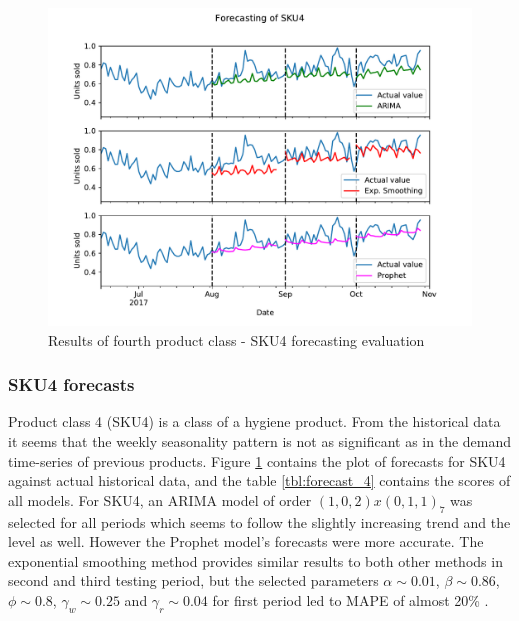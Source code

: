 \documentclass[11pt,a4paper]{article}
\begin{document}
\newpage
\begin{figure}
  \includegraphics[width=1\linewidth]{figures/SKU4_sep.pdf}
  \caption{Results of fourth product class - SKU4 forecasting evaluation}
  \label{fig:sku4_sep}
\end{figure}

\subsubsection{SKU4 forecasts}
Product class 4 (SKU4) is a class of a hygiene product. From the historical data it seems that the weekly seasonality  pattern is not as significant as in the demand time-series of previous products.
Figure \ref{fig:sku4_sep} contains the plot of forecasts for SKU4  against actual historical data, and the table  \ref{tbl:forecast_4} contains the scores of all models. For SKU4, an ARIMA model of order $(1,0,2)x(0,1,1)_7$ was selected for all periods which seems to follow the slightly increasing trend and the level as well. However the Prophet model's forecasts were more accurate.
The exponential smoothing method provides similar results to both other methods in second and third testing period, but the selected parameters $\alpha\sim 0.01$,  $\beta\sim 0.86$, $\phi\sim 0.8$,   $\gamma_w \sim 0.25$ and  $\gamma_r \sim 0.04$ for first period led to MAPE of almost 20\% .
\end{document}
